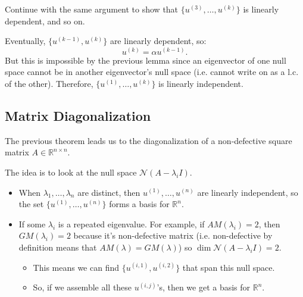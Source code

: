 \begin{derivation}
    Continue with the same argument to show that $\{u^{(3)}, \ldots, u^{(k)}\}$ is linearly dependent, and so on. 
    \vspace{1em}

    Eventually, $\{u^{(k-1)}, u^{(k)}\}$ are linearly dependent, so:
    \[
    u^{(k)} = \alpha u^{(k-1)}.
    \]
    But this is impossible by the previous lemma since an eigenvector of one null space cannot be in another eigenvector's null space (i.e. cannot write on as a l.c. of the other). Therefore, $\{u^{(1)}, \ldots, u^{(k)}\}$ is linearly independent.    
\end{derivation}

\subsection{Matrix Diagonalization}
\begin{intuition}
    The previous theorem leads us to the diagonalization of a non-defective square matrix $A \in \mathbb{R}^{n \times n}$. 
    \vspace{1em}

    The idea is to look at the null space $\mathcal{N}(A - \lambda_i I)$. 
    \begin{itemize}
        \item When $\lambda_1, \ldots, \lambda_n$ are distinct, then $u^{(1)}, \ldots, u^{(n)}$ are linearly independent, so the set $\{u^{(1)}, \ldots, u^{(n)}\}$ forms a basis for $\mathbb{R}^n$.
        \item If some $\lambda_i$ is a repeated eigenvalue. For example, if $AM(\lambda_i) = 2$, then $GM(\lambda_i) = 2$ because it's non-defective matrix (i.e. non-defective by definition means that $AM(\lambda)=GM(\lambda)$) so $\dim \mathcal{N}(A - \lambda_i I) = 2$. 
        \begin{itemize}
            \item This means we can find $\{u^{(i,1)}, u^{(i,2)}\}$ that span this null space.
            \item So, if we assemble all these $u^{(i,j)}$'s, then we get a basis for $\mathbb{R}^n$.
        \end{itemize}
    \end{itemize}
\end{intuition}

